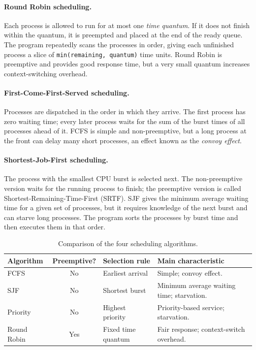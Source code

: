 \paragraph{Round Robin scheduling.}
Each process is allowed to run for at most one \emph{time quantum}. If it does not finish within the quantum, it is preempted and placed at the end of the ready queue. The program repeatedly scans the processes in order, giving each unfinished process a slice of \texttt{min(remaining, quantum)} time units. Round Robin is preemptive and provides good response time, but a very small quantum increases context-switching overhead.

\paragraph{First-Come-First-Served scheduling.}
Processes are dispatched in the order in which they arrive. The first process has zero waiting time; every later process waits for the sum of the burst times of all processes ahead of it. FCFS is simple and non-preemptive, but a long process at the front can delay many short processes, an effect known as the \emph{convoy effect}.

\paragraph{Shortest-Job-First scheduling.}
The process with the smallest CPU burst is selected next. The non-preemptive version waits for the running process to finish; the preemptive version is called Shortest-Remaining-Time-First (SRTF). SJF gives the minimum average waiting time for a given set of processes, but it requires knowledge of the next burst and can starve long processes. The program sorts the processes by burst time and then executes them in that order.

\begin{table}[H]
\centering
\renewcommand{\arraystretch}{1.2}
\small
\begin{tabularx}{\textwidth}{|l|c|>{\raggedright\arraybackslash}p{3.2cm}|>{\raggedright\arraybackslash}X|}
\hline
\textbf{Algorithm} & \textbf{Preemptive?} & \textbf{Selection rule} & \textbf{Main characteristic} \\ \hline
FCFS & No & Earliest arrival & Simple; convoy effect. \\ \hline
SJF & No & Shortest burst & Minimum average waiting time; starvation. \\ \hline
Priority & No & Highest priority & Priority-based service; starvation. \\ \hline
Round Robin & Yes & Fixed time quantum & Fair response; context-switch overhead. \\ \hline
\end{tabularx}
\caption{Comparison of the four scheduling algorithms.}
\end{table}

